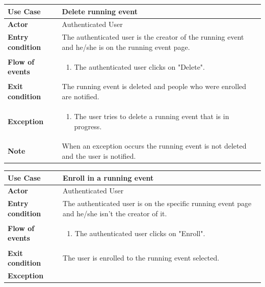 \documentclass[../main.tex]{subfiles}
\begin{document}
	\vspace*{3cm}
	\begin{center}
		\begin{tabular}{p{3cm}p{8.28cm}}
			\hline
			\textbf{Use Case} & Delete running event\\
			\hline
			\textbf{Actor} & Authenticated User\\
			\hline
			\textbf{Entry condition} & The authenticated user is the creator of the running event and he/she is on the running event page.\\
			\hline
			\textbf{Flow of events} & \begin{enumerate}
				\linespread{0}\item The authenticated user clicks on "Delete".
			\end{enumerate}\\
			\hline
			\textbf{Exit condition} & The running event is deleted and people who were enrolled are notified.\\
			\hline
			\textbf{Exception}& \begin{enumerate}
				\linespread{0}\item The user tries to delete a running event that is in progress.
			\end{enumerate}\\
			\hline
			\textbf{Note} & When an exception occurs the running event is not deleted and the user is notified.\\
			\hline
		\end{tabular}
	\end{center}
	\vspace*{3cm}
	\begin{center}
		\begin{tabular}{p{3cm}p{8.28cm}}
			\hline
			\textbf{Use Case} & Enroll in a running event\\
			\hline
			\textbf{Actor} & Authenticated User\\
			\hline
			\textbf{Entry condition} & The authenticated user is on the specific running event page and he/she isn't the creator of it.\\
			\hline
			\textbf{Flow of events} & \begin{enumerate}
				\linespread{0}\item The authenticated user clicks on "Enroll".
			\end{enumerate}\\
			\hline
			\textbf{Exit condition} & The user is enrolled to the running event selected.\\
			\hline
			\textbf{Exception}\\
			\hline
		\end{tabular}
	\end{center}
\end{document}
